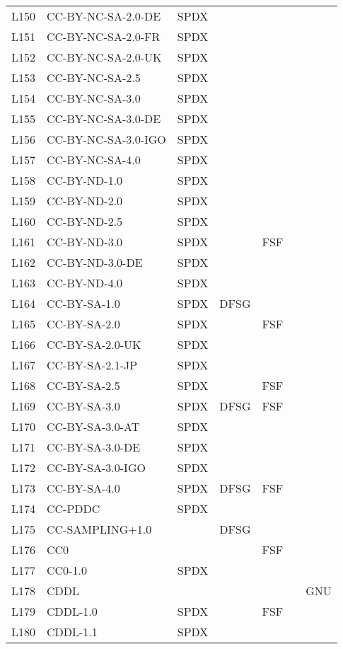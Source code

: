 \begin{longtable}[h]{m{2cm} | m{7cm} | c | c | c | c | c}
  L150 & CC-BY-NC-SA-2.0-DE & SPDX &  &  &  &  \\
  L151 & CC-BY-NC-SA-2.0-FR & SPDX &  &  &  &  \\
  L152 & CC-BY-NC-SA-2.0-UK & SPDX &  &  &  &  \\
  L153 & CC-BY-NC-SA-2.5 & SPDX &  &  &  &  \\
  L154 & CC-BY-NC-SA-3.0 & SPDX &  &  &  &  \\
  L155 & CC-BY-NC-SA-3.0-DE & SPDX &  &  &  &  \\
  L156 & CC-BY-NC-SA-3.0-IGO & SPDX &  &  &  &  \\
  L157 & CC-BY-NC-SA-4.0 & SPDX &  &  &  &  \\
  L158 & CC-BY-ND-1.0 & SPDX &  &  &  &  \\
  L159 & CC-BY-ND-2.0 & SPDX &  &  &  &  \\
  L160 & CC-BY-ND-2.5 & SPDX &  &  &  &  \\
  L161 & CC-BY-ND-3.0 & SPDX &  & FSF &  &  \\
  L162 & CC-BY-ND-3.0-DE & SPDX &  &  &  &  \\
  L163 & CC-BY-ND-4.0 & SPDX &  &  &  &  \\
  L164 & CC-BY-SA-1.0 & SPDX & DFSG &  &  &  \\
  L165 & CC-BY-SA-2.0 & SPDX &  & FSF &  &  \\
  L166 & CC-BY-SA-2.0-UK & SPDX &  &  &  &  \\
  L167 & CC-BY-SA-2.1-JP & SPDX &  &  &  &  \\
  L168 & CC-BY-SA-2.5 & SPDX &  & FSF &  &  \\
  L169 & CC-BY-SA-3.0 & SPDX & DFSG & FSF &  &  \\
  L170 & CC-BY-SA-3.0-AT & SPDX &  &  &  &  \\
  L171 & CC-BY-SA-3.0-DE & SPDX &  &  &  &  \\
  L172 & CC-BY-SA-3.0-IGO & SPDX &  &  &  &  \\
  L173 & CC-BY-SA-4.0 & SPDX & DFSG & FSF &  &  \\
  L174 & CC-PDDC & SPDX &  &  &  &  \\
  L175 & CC-SAMPLING+1.0 &  & DFSG &  &  &  \\
  L176 & CC0 &  &  & FSF &  &  \\
  L177 & CC0-1.0 & SPDX &  &  &  &  \\
  L178 & CDDL &  &  &  &  & GNU \\
  L179 & CDDL-1.0 & SPDX &  & FSF &  &  \\
  L180 & CDDL-1.1 & SPDX &  &  &  &  \\

\end{longtable}
